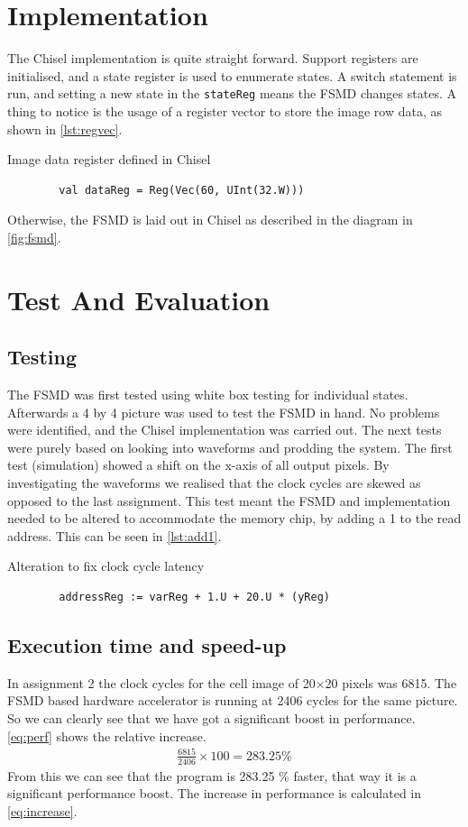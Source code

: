 \documentclass[a4paper, english]{article}
\numberwithin{equation}{section}
\begin{document}
\section{Implementation}
The Chisel implementation is quite straight forward. Support registers are initialised, and a state register is used to enumerate states. A switch statement is run, and setting a new state in the \texttt{stateReg} means the FSMD changes states. A thing to notice is the usage of a register vector to store the image row data, as shown in \cref{lst:regvec}.
\begin{listing}[H]
    \centering
    \caption{Image data register defined in Chisel}\label{lst:regvec}
    \begin{verbatim}
        val dataReg = Reg(Vec(60, UInt(32.W)))
\end{verbatim}
\end{listing}
Otherwise, the FSMD is laid out in Chisel as described in the diagram in \cref{fig:fsmd}.
\section{Test And Evaluation}
\subsection{Testing}
The FSMD was first tested using white box testing for individual states. Afterwards a 4 by 4 picture was used to test the FSMD in hand. No problems were identified, and the Chisel implementation was carried out. The next tests were purely based on looking into waveforms and prodding the system. The first test (simulation) showed a shift on the x-axis of all output pixels. By investigating the waveforms we realised that the clock cycles are skewed as opposed to the last assignment. This test meant the FSMD and implementation needed to be altered to accommodate the memory chip, by adding a 1 to the read address. This can be seen in \cref{lst:add1}.
\begin{listing}[H]
    \centering
    \caption{Alteration to fix clock cycle latency}\label{lst:add1}
    \begin{verbatim}
        addressReg := varReg + 1.U + 20.U * (yReg)
\end{verbatim}
\end{listing}
\subsection{Execution time and speed-up}
In assignment 2 the clock cycles for the cell image of 20\(\times\)20 pixels was 6815. The FSMD based hardware accelerator is running at 2406 cycles for the same picture. So we can clearly see that we have got a significant boost in performance. \cref{eq:perf} shows the relative increase.
\begin{align}
    \frac{6815}{2406} \times 100 = 283.25 \% \label{eq:perf}
\end{align}\newline
From this we can see that the program is 283.25 \% faster, that way it is a significant performance boost. The increase in performance is calculated in \cref{eq:increase}.
\end{document}
